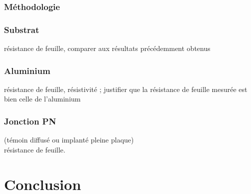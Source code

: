 \documentclass[11pt]{article}
\begin{document}
\subsubsection {M\'ethodologie }


\subsubsection{Substrat} 
   r\'esistance de feuille, comparer aux r\'esultats pr\'ec\'edemment obtenus
\subsubsection{ Aluminium}
r\'esistance de feuille, r\'esistivit\'e ; justifier que la r\'esistance de feuille mesur\'ee est bien celle de
     l'aluminium
\subsubsection{Jonction PN}
 (t\'emoin diffus\'e ou implant\'e pleine plaque) \\
    r\'esistance de feuille.

\clearpage

\section{Conclusion}
\end{document}
